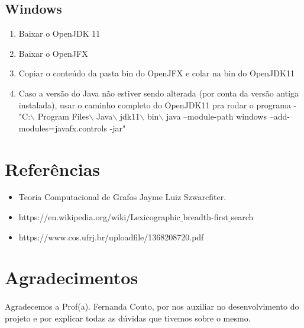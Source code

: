 \documentclass[a4paper, 11pt]{article}
\begin{document}
			\subsection{Windows}
			\begin{enumerate}
				\item Baixar o OpenJDK 11
				\item Baixar o OpenJFX
				\item Copiar o conteúdo da pasta bin do OpenJFX e colar na bin do OpenJDK11
				\item Caso a versão do Java não estiver sendo alterada (por conta da versão antiga instalada), usar o caminho completo do OpenJDK11 pra rodar o programa 
				- "C:$\backslash$ Program Files$\backslash$ Java$\backslash$ jdk11$\backslash$ bin$\backslash$ java --module-path windows --add-modules=javafx.controls -jar"
			\end{enumerate}
		\section{Referências}	
			\begin{itemize}
				\item Teoria Computacional de Grafos
				Jayme Luiz Szwarcfiter.
				
				\item https://en.wikipedia.org/wiki/Lexicographic$\_$breadth-first$\_$search
				
				\item https://www.cos.ufrj.br/uploadfile/1368208720.pdf
				
			\end{itemize}
		\section{Agradecimentos}
			\paragraph{} Agradecemos a Prof(a). Fernanda Couto, por nos auxiliar no desenvolvimento do projeto e por explicar todas as dúvidas que tivemos sobre o mesmo.
\end{document}
